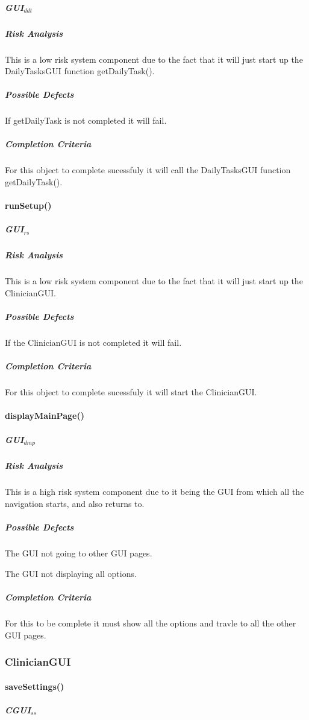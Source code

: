 \documentclass{article}
\begin{document}
\subparagraph{GUI$_{ddt}$}

\subparagraph{Risk Analysis}
This is a low risk system component due to the fact that it will just start up the DailyTasksGUI function getDailyTask().

\subparagraph{Possible Defects}
If getDailyTask is not completed it will fail.

\subparagraph{Completion Criteria}
For this object to complete sucessfuly it will call the DailyTasksGUI function getDailyTask().


\paragraph{runSetup()}

\subparagraph{GUI$_{rs}$}

\subparagraph{Risk Analysis}
This is a low risk system component due to the fact that it will just start up the ClinicianGUI.

\subparagraph{Possible Defects}
If the ClinicianGUI is not completed it will fail.


\subparagraph{Completion Criteria}
For this object to complete sucessfuly it will start the ClinicianGUI.


\paragraph{displayMainPage()}

\subparagraph{GUI$_{dmp}$}

\subparagraph{Risk Analysis}
This is a high risk system component due to it being the GUI from which all the navigation starts, and also returns to.

\subparagraph{Possible Defects}
The GUI not going to other GUI pages.

The GUI not displaying all options.

\subparagraph{Completion Criteria}
For this to be complete it must show all the options and travle to all the other GUI pages.

\subsubsection{ClinicianGUI}

\paragraph{saveSettings()}
\subparagraph{CGUI$_{ss}$}
\end{document}
